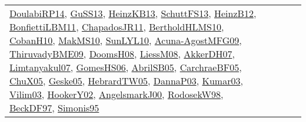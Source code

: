 {\begin{longtable}{lp{3cm}>{\raggedright}p{6cm}>{\raggedright}p{6cm}p{8cm}}
\href{papers/DoulabiRP14.pdf}{DoulabiRP14}\cite{DoulabiRP14}, \href{papers/GuSS13.pdf}{GuSS13}\cite{GuSS13}, \href{papers/HeinzKB13.pdf}{HeinzKB13}\cite{HeinzKB13}, \href{papers/SchuttFS13.pdf}{SchuttFS13}\cite{SchuttFS13}, \href{papers/HeinzB12.pdf}{HeinzB12}\cite{HeinzB12}, \href{papers/BonfiettiLBM11.pdf}{BonfiettiLBM11}\cite{BonfiettiLBM11}, \href{papers/ChapadosJR11.pdf}{ChapadosJR11}\cite{ChapadosJR11}, \href{papers/BertholdHLMS10.pdf}{BertholdHLMS10}\cite{BertholdHLMS10}, \href{papers/CobanH10.pdf}{CobanH10}\cite{CobanH10}, \href{papers/MakMS10.pdf}{MakMS10}\cite{MakMS10}, \href{papers/SunLYL10.pdf}{SunLYL10}\cite{SunLYL10}, \href{papers/Acuna-AgostMFG09.pdf}{Acuna-AgostMFG09}\cite{Acuna-AgostMFG09}, \href{papers/ThiruvadyBME09.pdf}{ThiruvadyBME09}\cite{ThiruvadyBME09}, \href{papers/DoomsH08.pdf}{DoomsH08}\cite{DoomsH08}, \href{articles/LiessM08.pdf}{LiessM08}\cite{LiessM08}, \href{papers/AkkerDH07.pdf}{AkkerDH07}\cite{AkkerDH07}, \href{papers/Limtanyakul07.pdf}{Limtanyakul07}\cite{Limtanyakul07}, \href{papers/GomesHS06.pdf}{GomesHS06}\cite{GomesHS06}, \href{papers/AbrilSB05.pdf}{AbrilSB05}\cite{AbrilSB05}, \href{papers/CarchraeBF05.pdf}{CarchraeBF05}\cite{CarchraeBF05}, \href{papers/ChuX05.pdf}{ChuX05}\cite{ChuX05}, \href{papers/Geske05.pdf}{Geske05}\cite{Geske05}, \href{papers/HebrardTW05.pdf}{HebrardTW05}\cite{HebrardTW05}, \href{papers/DannaP03.pdf}{DannaP03}\cite{DannaP03}, \href{papers/Kumar03.pdf}{Kumar03}\cite{Kumar03}, \href{papers/Vilim03.pdf}{Vilim03}\cite{Vilim03}, \href{papers/HookerY02.pdf}{HookerY02}\cite{HookerY02}, \href{papers/AngelsmarkJ00.pdf}{AngelsmarkJ00}\cite{AngelsmarkJ00}, \href{papers/RodosekW98.pdf}{RodosekW98}\cite{RodosekW98}, \href{papers/BeckDF97.pdf}{BeckDF97}\cite{BeckDF97}, \href{papers/Simonis95.pdf}{Simonis95}\cite{Simonis95}\\

\end{longtable}}
